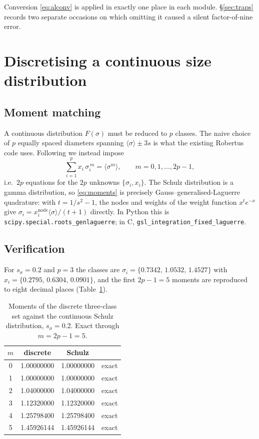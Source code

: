 \documentclass[11pt,a4paper]{article}
\newcommand{\code}[1]{\texttt{#1}}
\begin{document}
Conversion \eqref{eq:alconv} is applied in exactly one place in each module.
\S\ref{sec:traps} records two separate occasions on which omitting it caused
a silent factor-of-nine error.

\section{Discretising a continuous size distribution}
\label{sec:moments}

\subsection{Moment matching}

A continuous distribution $F(\sigma)$ must be reduced to $p$ classes. The
naive choice of $p$ equally spaced diameters spanning
$\langle\sigma\rangle\pm3s$ is what the existing Robertus code uses. Following
\cite{daguanno1992} we instead impose
\begin{equation}
\sum_{i=1}^{p} x_i\,\sigma_i^{\,m} = \langle\sigma^m\rangle,
\qquad m=0,1,\dots,2p-1,
\label{eq:moments}
\end{equation}
i.e.\ $2p$ equations for the $2p$ unknowns $\{\sigma_i,x_i\}$. The Schulz
distribution is a gamma distribution, so \eqref{eq:moments} is precisely
Gauss--generalised-Laguerre quadrature: with $t=1/s^2-1$, the nodes and
weights of the weight function $x^{t}e^{-x}$ give
$\sigma_i = x_i^{\mathrm{node}}\langle\sigma\rangle/(t+1)$ directly. In Python
this is \code{scipy.special.roots\_genlaguerre}; in C,
\code{gsl\_integration\_fixed\_laguerre}.

\subsection{Verification}

For $s_\sigma=0.2$ and $p=3$ the classes are
$\sigma_i=\{0.7342,\,1.0532,\,1.4527\}$ with
$x_i=\{0.2795,\,0.6304,\,0.0901\}$, and the first $2p-1=5$ moments are
reproduced to eight decimal places (Table~\ref{tab:moments}).

\begin{table}[htbp]
\centering
\caption{Moments of the discrete three-class set against the continuous
Schulz distribution, $s_\sigma=0.2$. Exact through $m=2p-1=5$.}
\label{tab:moments}
\begin{tabular}{cccl}
\toprule
$m$ & discrete & Schulz & \\
\midrule
0 & 1.00000000 & 1.00000000 & exact \\
1 & 1.00000000 & 1.00000000 & exact \\
2 & 1.04000000 & 1.04000000 & exact \\
3 & 1.12320000 & 1.12320000 & exact \\
4 & 1.25798400 & 1.25798400 & exact \\
5 & 1.45926144 & 1.45926144 & exact \\
\bottomrule
\end{tabular}
\end{table}
\end{document}
